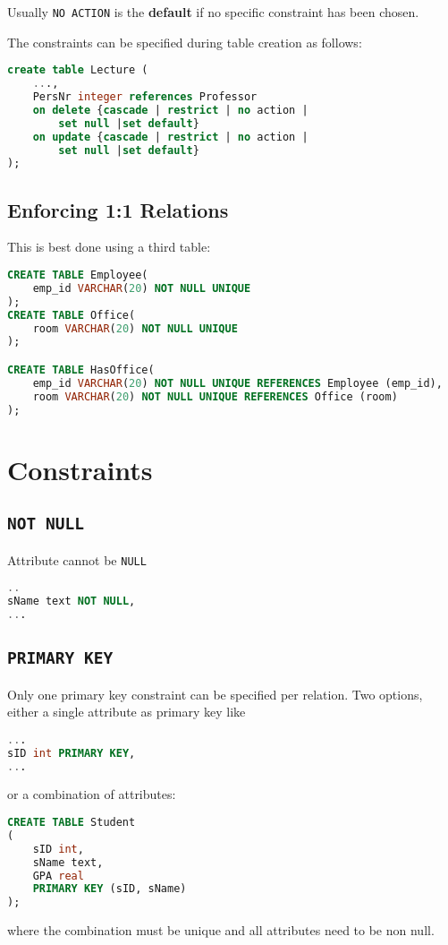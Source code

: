 \documentclass{sciposter}
\renewcommand{\t}[1]{\texttt{#1}}
\begin{document}
\begin{multicols}{3}
Usually \t{NO ACTION} is the \textbf{default} if no specific constraint has been chosen.

The constraints can be specified during table creation as follows:

\begin{lstlisting}[language=SQL]
create table Lecture (
	...,
	PersNr integer references Professor
	on delete {cascade | restrict | no action |
		set null |set default}
	on update {cascade | restrict | no action |
		set null |set default}
); 
\end{lstlisting}

\subsection*{Enforcing 1:1 Relations}

This is best done using a third table:
\begin{lstlisting}[language=SQL]
CREATE TABLE Employee(
	emp_id VARCHAR(20) NOT NULL UNIQUE
);
CREATE TABLE Office(
	room VARCHAR(20) NOT NULL UNIQUE
);

CREATE TABLE HasOffice(
	emp_id VARCHAR(20) NOT NULL UNIQUE REFERENCES Employee (emp_id),
	room VARCHAR(20) NOT NULL UNIQUE REFERENCES Office (room)
);
\end{lstlisting}

\section*{Constraints}

\subsection*{\t{NOT NULL}}
Attribute cannot be \t{NULL}
\begin{lstlisting}[language=SQL]
..
sName text NOT NULL,
...

\end{lstlisting}
\subsection*{\t{PRIMARY KEY}}
Only one primary key constraint can be specified per relation.
Two options, either a single attribute as primary key like
\begin{lstlisting}[language=SQL]
...
sID int PRIMARY KEY,
...
\end{lstlisting}
or a combination of attributes:
\begin{lstlisting}[language=SQL]
CREATE TABLE Student
(
	sID int,
	sName text,
	GPA real
	PRIMARY KEY (sID, sName)
);
\end{lstlisting}
where the combination must be unique and all attributes need to be non null.

\end{multicols}
\end{document}
